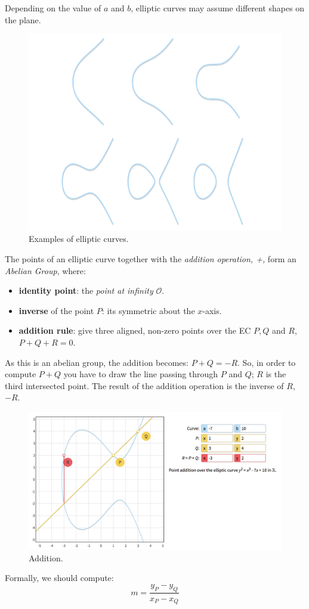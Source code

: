 Depending on the value of $a$ and $b$, elliptic curves may assume different shapes on the plane.

\begin{figure}[H]
	\centering
	\includegraphics[width=.75\textwidth]{eccurves.png}
	\caption{Examples of elliptic curves\cite{graf}.}
	\label{img:ec_curves}
\end{figure}

The points of an elliptic curve together with the \textit{addition operation, +,} form an \textit{Abelian Group}, where:
\begin{itemize}
	\item \textbf{identity point}: the \textit{point at infinity} $\mathcal{O}$.
	\item \textbf{inverse} of the point $P$: its symmetric about the $x$-axis.
	\item \textbf{addition rule}: give three aligned, non-zero points over the EC $P,Q$ and $R$, $P+Q+R=0$.
\end{itemize}
As this is an abelian group, the addition becomes: $P+Q=-R$. So, in order to compute $P+Q$ you have to draw the line passing through $P$ and $Q$; $R$ is the third intersected point. The result of the addition operation is the inverse of $R$, $-R$.

\begin{figure}[H]
	\centering
	\includegraphics[width=.7\textwidth]{ec_somma.png}
	\caption{Addition\cite{graf}.}
	\label{img:ec sum}
\end{figure}
Formally, we should compute:
\begin{equation}
m=\frac{y_{P}-y_{Q}}{x_{P}-x_{Q}}
\end{equation}

